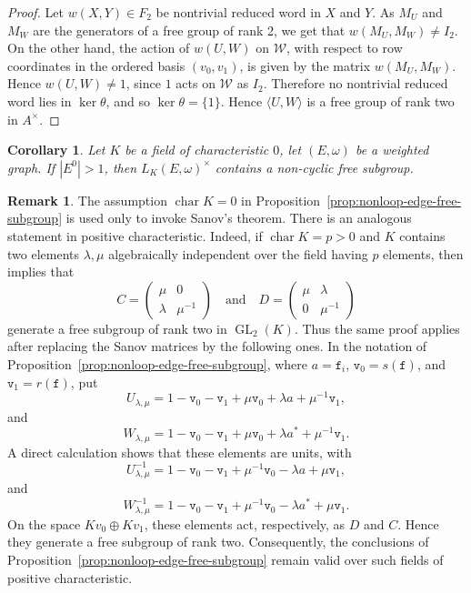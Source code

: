 \documentclass{article}
\newtheorem{corollary}{Corollary}
\theoremstyle{definition}
\newtheorem{remark}{Remark}
\begin{document}
\begin{proof}
Let $w(X,Y)\in F_2$ be nontrivial reduced word in $X$ and $Y$. As $M_U$ and $M_W$ are the generators of a free group of rank 2, we get that $w(M_U,M_W)\neq I_2$. On the other hand, the action of $w(U,W)$ on $\mathcal W$, with respect to
row coordinates in the ordered basis $(v_0,v_1)$, is given by the matrix
$w(M_U,M_W)$. Hence $w(U,W)\neq 1$, since $1$ acts on
$\mathcal W$ as $I_2$. Therefore no nontrivial reduced word lies in
$\ker\theta$, and so $\ker\theta=\{1\}$. Hence
$\langle U,W\rangle$ is a free group of rank two in $A^\times$.
\end{proof}

\begin{corollary}\label{cor:multivertex-free-subgroup}
Let $K$ be a field of characteristic $0$, let $(E,\omega)$ be a
weighted graph. If $|E^0|>1$, then $L_K(E,\omega)^\times$
contains a non-cyclic free subgroup.
\end{corollary}

\begin{remark}\label{rem:positive-characteristic}
The assumption $\operatorname{char}K=0$ in
Proposition~\ref{prop:nonloop-edge-free-subgroup} is used only to invoke
Sanov's theorem. There is an analogous statement in positive characteristic.
Indeed, if $\operatorname{char}K=p>0$ and $K$ contains two elements
$\lambda,\mu$ algebraically independent over the field having $p$ elements, then
\cite[Lemma~2.8, p.~30, and Exercises~2.2--2.3, p.~31]{W}
implies that
$$
C=\begin{pmatrix}\mu&0\\ \lambda&\mu^{-1}\end{pmatrix}
\quad\text{and}\quad
D=\begin{pmatrix}\mu&\lambda\\ 0&\mu^{-1}\end{pmatrix}
$$
generate a free subgroup of rank two in $\operatorname{GL}_2(K)$.
Thus the same proof applies after replacing the Sanov matrices by the following
ones. In the notation of Proposition~\ref{prop:nonloop-edge-free-subgroup},
where $a=\mathtt{f}_i$, $\mathtt{v}_0=s(\mathtt{f})$, and
$\mathtt{v}_1=r(\mathtt{f})$, put
$$
U_{\lambda,\mu}
=
1-\mathtt{v}_0-\mathtt{v}_1
+\mu\mathtt{v}_0+\lambda a+\mu^{-1}\mathtt{v}_1,
$$
and
$$
W_{\lambda,\mu}
=
1-\mathtt{v}_0-\mathtt{v}_1
+\mu\mathtt{v}_0+\lambda a^*+\mu^{-1}\mathtt{v}_1.
$$
A direct calculation shows that these elements are units, with
$$
U_{\lambda,\mu}^{-1}
=
1-\mathtt{v}_0-\mathtt{v}_1
+\mu^{-1}\mathtt{v}_0-\lambda a+\mu\mathtt{v}_1,
$$
and
$$
W_{\lambda,\mu}^{-1}
=
1-\mathtt{v}_0-\mathtt{v}_1
+\mu^{-1}\mathtt{v}_0-\lambda a^*+\mu\mathtt{v}_1.
$$
On the space $Kv_0\oplus Kv_1$, these elements act, respectively,
as $D$ and $C$. Hence they generate a free subgroup of rank two. Consequently,
the conclusions of Proposition~\ref{prop:nonloop-edge-free-subgroup}
remain valid over such
fields of positive characteristic.
\end{remark}
\end{document}
